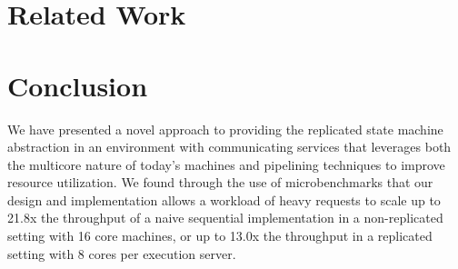\documentclass[11pt, oneside]{report}
\begin{document}
\chapter{Related Work}\label{RelatedWork}

\chapter{Conclusion}\label{Conclusion}

We have presented a novel approach to providing the replicated state machine abstraction in an environment with communicating services that leverages both the multicore nature of today's machines and pipelining techniques to improve resource utilization. We found through the use of microbenchmarks that our design and implementation allows a workload of heavy requests to scale up to 21.8x the throughput of a naive sequential implementation in a non-replicated setting with 16 core machines, or up to 13.0x the throughput in a replicated setting with 8 cores per execution server.
\end{document}
